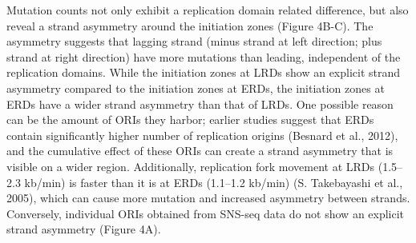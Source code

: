 Mutation counts not only exhibit a replication domain related difference, but also reveal a strand asymmetry around the initiation zones (Figure 4B-C). The asymmetry suggests that lagging strand (minus strand at left direction; plus strand at right direction) have more mutations than leading, independent of the replication domains. While the initiation zones at LRDs show an explicit strand asymmetry compared to the initiation zones at ERDs, the initiation zones at ERDs have a wider strand asymmetry than that of LRDs. One possible reason can be the amount of ORIs they harbor; earlier studies suggest that ERDs contain significantly higher number of replication origins (Besnard et al., 2012), and the cumulative effect of these ORIs can create a strand asymmetry that is visible on a wider region. Additionally, replication fork movement at LRDs (1.5–2.3 kb/min) is faster than it is at ERDs (1.1–1.2 kb/min) (S. Takebayashi et al., 2005), which can cause more mutation and increased asymmetry between strands. Conversely, individual ORIs obtained from SNS-seq data do not show an explicit strand asymmetry (Figure 4A).

